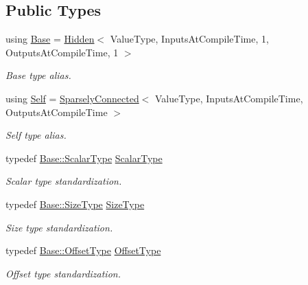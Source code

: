 \subsection*{Public Types}
\begin{DoxyCompactItemize}
\item 
using \hyperlink{classffnn_1_1layer_1_1_sparsely_connected_af35eb87098c81ea0eb0cd9b3b702a614}{Base} = \hyperlink{classffnn_1_1layer_1_1_hidden}{Hidden}$<$ Value\-Type, Inputs\-At\-Compile\-Time, 1, Outputs\-At\-Compile\-Time, 1 $>$
\begin{DoxyCompactList}\small\item\em Base type alias. \end{DoxyCompactList}\item 
using \hyperlink{classffnn_1_1layer_1_1_sparsely_connected_ad27c96a5f26e2f44fb25bebd9a838666}{Self} = \hyperlink{classffnn_1_1layer_1_1_sparsely_connected}{Sparsely\-Connected}$<$ Value\-Type, Inputs\-At\-Compile\-Time, Outputs\-At\-Compile\-Time $>$
\begin{DoxyCompactList}\small\item\em Self type alias. \end{DoxyCompactList}\item 
typedef \hyperlink{classffnn_1_1layer_1_1internal_1_1_interface_a7f834e3365e5199bcbcd16d9abd63941}{Base\-::\-Scalar\-Type} \hyperlink{classffnn_1_1layer_1_1_sparsely_connected_abe2b75254f39c0bec9f02b2e906e7919}{Scalar\-Type}
\begin{DoxyCompactList}\small\item\em Scalar type standardization. \end{DoxyCompactList}\item 
typedef \hyperlink{classffnn_1_1layer_1_1internal_1_1_interface_af0567642f60c65b5e87067226a54174b}{Base\-::\-Size\-Type} \hyperlink{classffnn_1_1layer_1_1_sparsely_connected_a86b75c2723c1f8b6771224257f5eb1c1}{Size\-Type}
\begin{DoxyCompactList}\small\item\em Size type standardization. \end{DoxyCompactList}\item 
typedef \hyperlink{classffnn_1_1layer_1_1internal_1_1_interface_adc5bb454329ebd51ac26579a43c006fd}{Base\-::\-Offset\-Type} \hyperlink{classffnn_1_1layer_1_1_sparsely_connected_aca8272f02c6417eea3c77dc0cb2bb49e}{Offset\-Type}
\begin{DoxyCompactList}\small\item\em Offset type standardization. \end{DoxyCompactList}\item 

\end{DoxyCompactItemize}
